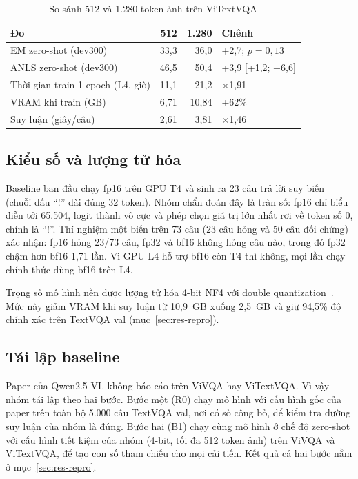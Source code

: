 \begin{table}[htbp]
\caption{So sánh 512 và 1.280 token ảnh trên ViTextVQA}
\label{tab:met-res}
\centering
\small
\begin{tabular}{p{}rrp{}}
\toprule
\textbf{Đo} & \textbf{512} & \textbf{1.280} & \textbf{Chênh} \\
\midrule
EM zero-shot (dev300) & 33,3 & 36,0 & +2,7; $p = 0{,}13$ \\
ANLS zero-shot (dev300) & 46,5 & 50,4 & +3,9 [+1,2; +6,6] \\
Thời gian train 1 epoch (L4, giờ) & 11,1 & 21,2 & $\times$1,91 \\
VRAM khi train (GB) & 6,71 & 10,84 & +62\% \\
Suy luận (giây/câu) & 2,61 & 3,81 & $\times$1,46 \\
\bottomrule
\end{tabular}
\end{table}

\subsection{Kiểu số và lượng tử hóa}
\label{sec:met-dtype}

Baseline ban đầu chạy fp16 trên GPU T4 và sinh ra 23 câu trả lời suy biến (chuỗi
dấu ``!'' dài đúng 32 token). Nhóm chẩn đoán đây là tràn số: fp16 chỉ biểu diễn
tới 65.504, logit thành vô cực và phép chọn giá trị lớn nhất rơi về token số 0,
chính là ``!''. Thí nghiệm một biến trên 73 câu (23 câu hỏng và 50 câu đối chứng)
xác nhận: fp16 hỏng 23/73 câu, fp32 và bf16 không hỏng câu nào, trong đó fp32
chậm hơn bf16 1,71 lần. Vì GPU L4 hỗ trợ bf16 còn T4 thì không, mọi lần chạy
chính thức dùng bf16 trên L4.

Trọng số mô hình nền được lượng tử hóa 4-bit NF4 với double
quantization~\cite{dettmers2023qlora}. Mức này giảm VRAM khi suy luận từ 10,9~GB
xuống 2,5~GB và giữ 94,5\% độ chính xác trên TextVQA val
(mục~\ref{sec:res-repro}).

\subsection{Tái lập baseline}

Paper của Qwen2.5-VL không báo cáo trên ViVQA hay ViTextVQA. Vì vậy nhóm tái lập
theo hai bước. Bước một (R0) chạy mô hình với cấu hình gốc của paper trên toàn bộ
5.000 câu TextVQA val, nơi có số công bố, để kiểm tra đường suy luận của nhóm là
đúng. Bước hai (B1) chạy cùng mô hình ở chế độ zero-shot với cấu hình tiết kiệm
của nhóm (4-bit, tối đa 512 token ảnh) trên ViVQA và ViTextVQA, để tạo con số
tham chiếu cho mọi cải tiến. Kết quả cả hai bước nằm ở mục~\ref{sec:res-repro}.


